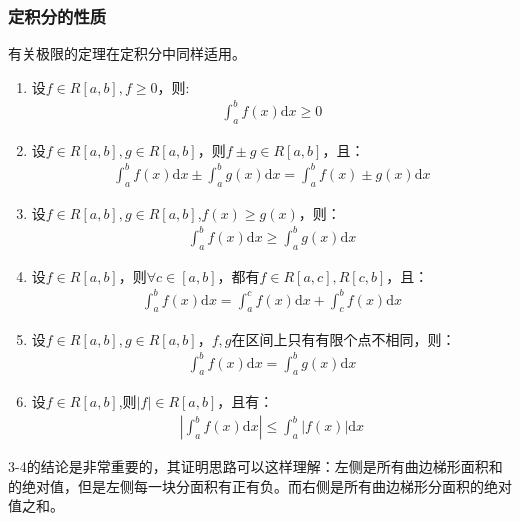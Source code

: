 \documentclass{ctexart}
\begin{document}
\subsubsection{定积分的性质}
有关极限的定理在定积分中同样适用。
\begin{tcolorbox}[
    colback=bac2,     %
    colframe=fra2,   %
    coltitle=white,             %
    coltext=tex2,
    title=定积分的性质,
    fonttitle=\bfseries,        %
arc=3mm,                     %
breakable
]
\begin{enumerate}
    \item 设$f\in R[a,b],f\geq 0$，则:
    \begin{align*}
        \int_a^b f(x)\mathrm{d}x\geq 0
    \end{align*}
    \item 设$f\in R[a,b],g\in R[a,b]$，则$f\pm g\in R[a,b]$，且：
    \begin{align*}
        \int_a^b f(x)\mathrm{d}x\pm\int_a^b g(x)\mathrm{d}x=\int_a^b f(x)\pm g(x)\mathrm{d}x
    \end{align*}
    \item 设$f\in R[a,b],g\in R[a,b]$,$f(x)\geq g(x)$，则：
    \begin{align*}
        \int_a^b f(x)\mathrm{d}x\geq \int_a^b g(x)\mathrm{d}x
    \end{align*}
 \item 设$f\in R[a,b]$，则$\forall c\in[a,b]$，都有$f\in R[a,c],R[c,b]$，且：
 \begin{align*}
     \int_a^b f(x)\mathrm{d}x=\int_a^cf(x)\mathrm{d}x+\int_c^b f(x)\mathrm{d}x
 \end{align*}
 \item 设$f\in R[a,b],g\in R[a,b]$，$f,g$在区间上只有有限个点不相同，则：
 \begin{align*}
     \int_a^b f(x)\mathrm{d}x=\int_a^b g(x)\mathrm{d}x
 \end{align*}

 \item  设$f\in R[a,b]$,则$|f|\in R[a,b]$，且有：
 \begin{align*}
     |\int_a^b f(x)\mathrm{d}x|\leq \int_a^b |f(x)|\mathrm{d}x\tag{5-4}
\end{align*}
\end{enumerate}
\end{tcolorbox}

3-4的结论是非常重要的，其证明思路可以这样理解：左侧是所有曲边梯形面积和的绝对值，但是左侧每一块分面积有正有负。而右侧是所有曲边梯形分面积的绝对值之和。
\end{document}
